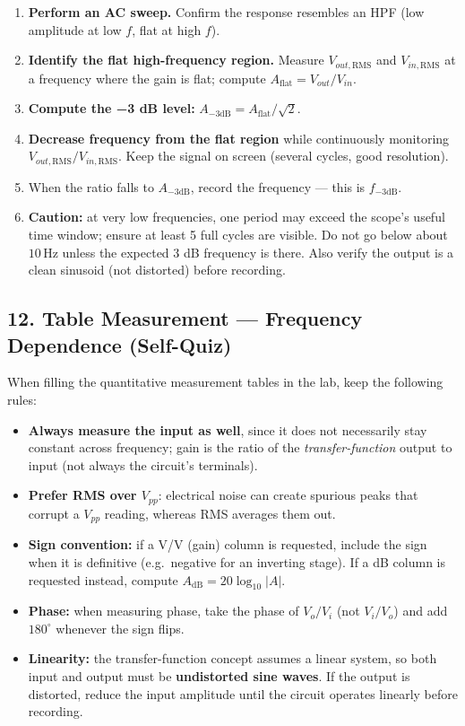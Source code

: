 \documentclass[
  11pt,
]{article}
\providecommand{\tightlist}{%
  \setlength{\itemsep}{0pt}\setlength{\parskip}{0pt}}
\begin{document}
\begin{enumerate}
\def\labelenumi{\arabic{enumi}.}
\tightlist
\item
  \textbf{Perform an AC sweep.} Confirm the response resembles an HPF
  (low amplitude at low \(f\), flat at high \(f\)).
\item
  \textbf{Identify the flat high-frequency region.} Measure
  \(V_{out,\text{RMS}}\) and \(V_{in,\text{RMS}}\) at a frequency where
  the gain is flat; compute \(A_\text{flat} = V_{out}/V_{in}\).
\item
  \textbf{Compute the −3 dB level:}
  \(A_{-3\mathrm{dB}} = A_\text{flat}/\sqrt{2}\).
\item
  \textbf{Decrease frequency from the flat region} while continuously
  monitoring \(V_{out,\text{RMS}}/V_{in,\text{RMS}}\). Keep the signal
  on screen (several cycles, good resolution).
\item
  When the ratio falls to \(A_{-3\mathrm{dB}}\), record the frequency
  --- this is \(f_{-3\mathrm{dB}}\).
\item
  \textbf{Caution:} at very low frequencies, one period may exceed the
  scope's useful time window; ensure at least 5 full cycles are visible.
  Do not go below about \(10\,\mathrm{Hz}\) unless the expected 3 dB
  frequency is there. Also verify the output is a clean sinusoid (not
  distorted) before recording.
\end{enumerate}

\newpage

\subsection{12. Table Measurement --- Frequency Dependence
(Self-Quiz)}\label{table-measurement-frequency-dependence-self-quiz}

When filling the quantitative measurement tables in the lab, keep the
following rules:

\begin{itemize}
\tightlist
\item
  \textbf{Always measure the input as well}, since it does not
  necessarily stay constant across frequency; gain is the ratio of the
  \emph{transfer-function} output to input (not always the circuit's
  terminals).
\item
  \textbf{Prefer RMS over \(V_{pp}\)}: electrical noise can create
  spurious peaks that corrupt a \(V_{pp}\) reading, whereas RMS averages
  them out.
\item
  \textbf{Sign convention:} if a V/V (gain) column is requested, include
  the sign when it is definitive (e.g.~negative for an inverting stage).
  If a dB column is requested instead, compute
  \(A_\mathrm{dB} = 20\log_{10}|A|\).
\item
  \textbf{Phase:} when measuring phase, take the phase of \(V_o/V_i\)
  (not \(V_i/V_o\)) and add \(180^\circ\) whenever the sign flips.
\item
  \textbf{Linearity:} the transfer-function concept assumes a linear
  system, so both input and output must be \textbf{undistorted sine
  waves}. If the output is distorted, reduce the input amplitude until
  the circuit operates linearly before recording.
\end{itemize}
\end{document}
